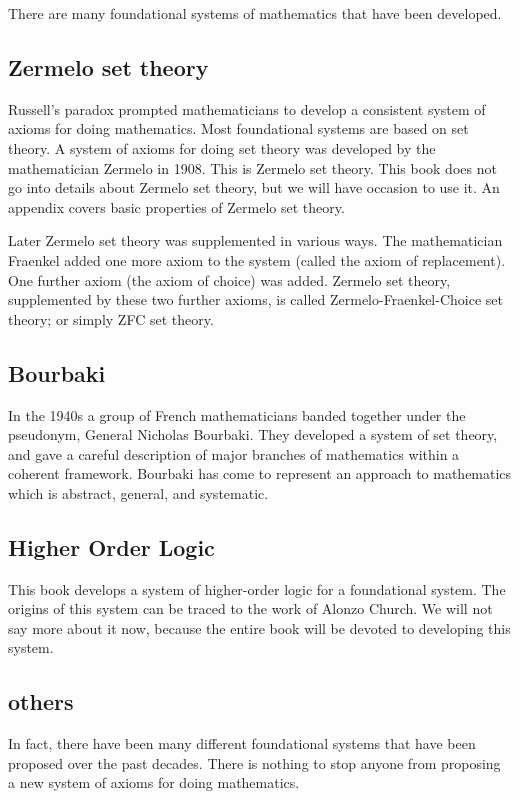 \documentclass[cup9a]{cupbook}
\begin{document}
There are many foundational systems of mathematics that have been developed.

\subsection{Zermelo set theory}

Russell's paradox prompted mathematicians to develop a consistent system of axioms for doing mathematics.  Most foundational systems are based on set theory.  A system of axioms for doing set theory 
was developed by the mathematician Zermelo in 1908.   This is Zermelo set theory.  This book does not go into details about Zermelo set theory, but we will have occasion to use it.  An appendix covers basic properties of Zermelo set theory.

Later Zermelo set theory was supplemented in various ways.  The mathematician Fraenkel added one more axiom to the system (called the axiom of replacement).  One further axiom (the axiom of choice) was added.  Zermelo set theory, supplemented by these two further axioms, is called Zermelo-Fraenkel-Choice set theory; or simply ZFC set theory.

\subsection{Bourbaki}

In the 1940s a group of French mathematicians banded together under the pseudonym, General Nicholas Bourbaki.  They developed a system of set theory, and gave a careful description of major branches of mathematics within a coherent framework.  Bourbaki has come to represent an approach to mathematics which is abstract, general, and systematic.

\subsection{Higher Order Logic}

This book develops a system of higher-order logic for a foundational system.  The origins of this system can be traced to the work of Alonzo Church.  We will not say more about it now, because the entire book will be devoted to developing this system.

\subsection{others}


In fact, there have been many different foundational systems that have been proposed over the past decades.  There is nothing to stop anyone from proposing a new system of axioms for doing mathematics.
\end{document}
